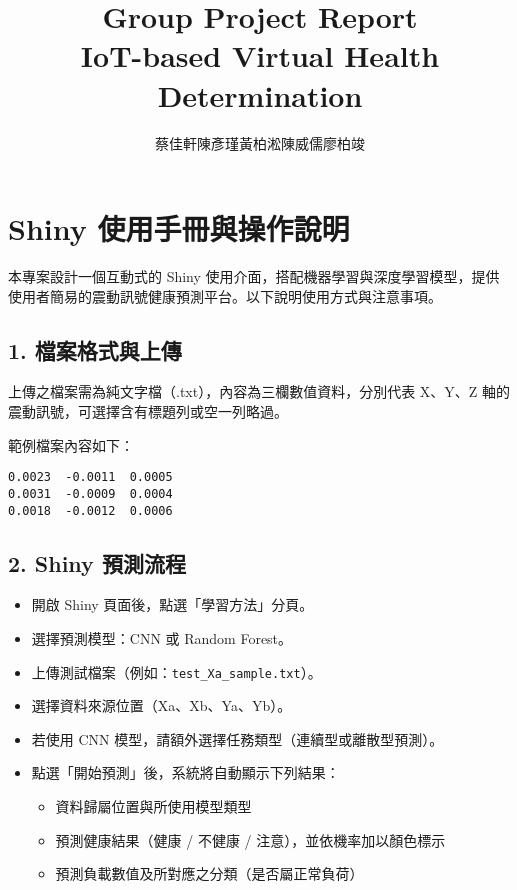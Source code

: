 \documentclass[a4paper,12pt]{article}
\begin{document}
\title{Group Project Report\\IoT-based Virtual Health Determination}
\author{\footnotesize{蔡佳軒\;陳彥瑾\;黃柏淞\;陳威儒\;廖柏竣}}
\maketitle
\thispagestyle{empty}
\vspace{1cm}
\newpage

\setcounter{page}{1}

\section*{Shiny 使用手冊與操作說明}

本專案設計一個互動式的 Shiny 使用介面，搭配機器學習與深度學習模型，提供使用者簡易的震動訊號健康預測平台。以下說明使用方式與注意事項。

\subsection*{1. 檔案格式與上傳}

上傳之檔案需為純文字檔（.txt），內容為三欄數值資料，分別代表 X、Y、Z 軸的震動訊號，可選擇含有標題列或空一列略過。

\vspace{0.5em}
範例檔案內容如下：
\begin{verbatim}
0.0023  -0.0011  0.0005
0.0031  -0.0009  0.0004
0.0018  -0.0012  0.0006
\end{verbatim}

\subsection*{2. Shiny 預測流程}

\begin{itemize}
  \item 開啟 Shiny 頁面後，點選「學習方法」分頁。
  \item 選擇預測模型：CNN 或 Random Forest。
  \item 上傳測試檔案（例如：\texttt{test\_Xa\_sample.txt}）。
  \item 選擇資料來源位置（Xa、Xb、Ya、Yb）。
  \item 若使用 CNN 模型，請額外選擇任務類型（連續型或離散型預測）。
  \item 點選「開始預測」後，系統將自動顯示下列結果：
  \begin{itemize}
    \item 資料歸屬位置與所使用模型類型
    \item 預測健康結果（健康 / 不健康 / 注意），並依機率加以顏色標示
    \item 預測負載數值及所對應之分類（是否屬正常負荷）
  \end{itemize}
\end{itemize}
\end{document}
